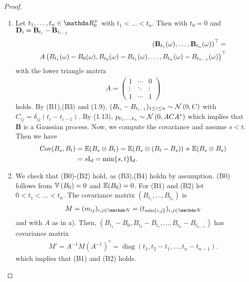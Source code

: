 \begin{proof}
\begin{enumerate}[label=(\alph*)]
\item Let $t_1, \dots, t_n \in \R_0^+$ with $t_1 < \dots < t_n$.
	Then with \(t_0 = 0\) and \(\mathbf D_i = \mathbf{B}_{t_i} - \mathbf{B}_{t_{i-1}}\)
	\begin{align*}
		\left(\mathbf{B}_{t_1}(\omega), \dots, \mathbf{B}_{t_n}(\omega)\right)^\top=\\
	A\left(B_{t_1}(\omega)-B_0(\omega),B_{t_2}(\omega)-B_{t_1}(\omega),\dots,B_{t_n}(\omega)-B_{t_{n-1}}(\omega)\right)^\top
	\end{align*}
	with the lower triangle matrix
	\begin{align*}
	A=\begin{pmatrix}
	1 & \cdots & 0\\
	\vdots & \ddots & \vdots\\
	1 & \cdots & 1
	\end{pmatrix}
	\end{align*}
	holds.
	By (B1),(B3) and (1.9), $(B_{t_i}-B_{t_{i-1}})_{1 \leq i \leq n}\sim \mathcal{N}\left(0,C\right)$
	with $C_{ij}=\delta_{ij}(t_i-t_{i-1})$.
	By (1.13), $p_{t_1,\dots,t_n}\sim \mathcal{N}\left(0,ACA^\ast\right)$ which implies that $\textbf{B}$ is a Gaussian process.
	Now, we compute the covariance and assume $s<t$. Then we have
	\begin{align*}
	\Cov(B_s,B_t)&=\E{B_s\otimes B_t}=\E{B_s\otimes (B_t-B_s)} + \E{B_s \otimes B_s}\\
	&=s \Id=\min\{s,t\}\Id.
	\end{align*}
\item We check that (B0)-(B2) hold, as (B3),(B4) holdn by assumption.
(B0) follows from $\mathbb{V}\left(B_0\right)=0$ and $\E{B_0}=0$.
For (B1) and (B2) let $0<t_1<\dots<t_n$.
The covariance matrix $(B_{t_1},\dots,B_{t_n})$ is
\begin{align*}
M=(m_{ij})_{i,j\in \N}=(t_{\min\{i,j\}})_{i,j \in \N}
\end{align*}
and with $A$ as in a).
Then, $(B_{t_1}-B_0,B_{t_2}-B_{t_1},\dots,B_{t_n}-B_{t_{n-1}})$ has covariance matrix
\begin{align*}
M'=A^{-1}M\left(A^{-1}\right)^\ast=\operatorname{diag}(t_1,t_2-t_1,\dots,t_n-t_{n-1}).
\end{align*}
which implies that (B1) and (B2) holds. \qedhere
\end{enumerate}
\end{proof}

